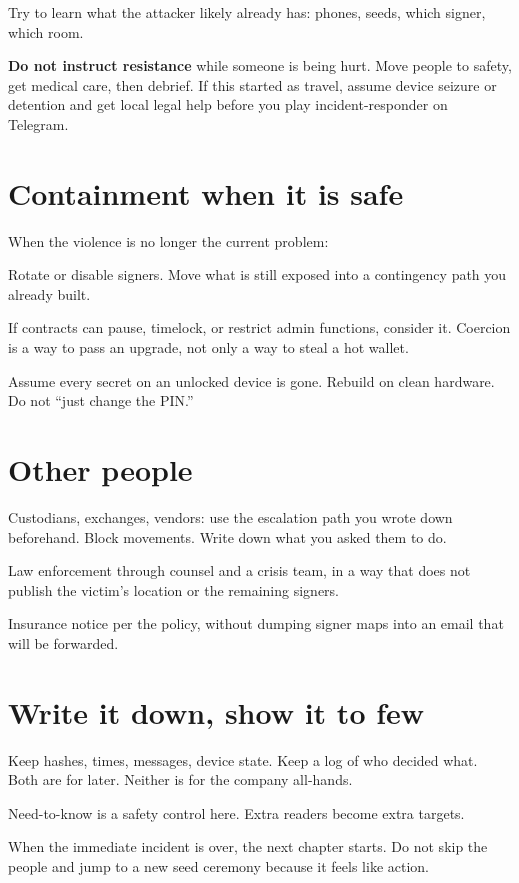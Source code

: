 Try to learn what the attacker likely already has:
phones, seeds, which signer, which room.

\textbf{Do not instruct resistance} while someone is
being hurt. Move people to safety, get medical care, then
debrief. If this started as travel, assume device seizure
or detention and get local legal help before you play
incident-responder on Telegram.

\section{Containment when it is safe}

When the violence is no longer the current problem:

Rotate or disable signers. Move what is still exposed
into a contingency path you already built.

If contracts can pause, timelock, or restrict admin
functions, consider it. Coercion is a way to pass an
upgrade, not only a way to steal a hot wallet.

Assume every secret on an unlocked device is gone.
Rebuild on clean hardware. Do not ``just change the PIN.''

\section{Other people}

Custodians, exchanges, vendors: use the escalation path
you wrote down beforehand. Block movements. Write down
what you asked them to do.

Law enforcement through counsel and a crisis team, in a
way that does not publish the victim's location or the
remaining signers.

Insurance notice per the policy, without dumping signer
maps into an email that will be forwarded.

\section{Write it down, show it to few}

Keep hashes, times, messages, device state. Keep a log of
who decided what. Both are for later. Neither is for the
company all-hands.

Need-to-know is a safety control here. Extra readers
become extra targets.

When the immediate incident is over, the next chapter
starts. Do not skip the people and jump to a new seed
ceremony because it feels like action.
